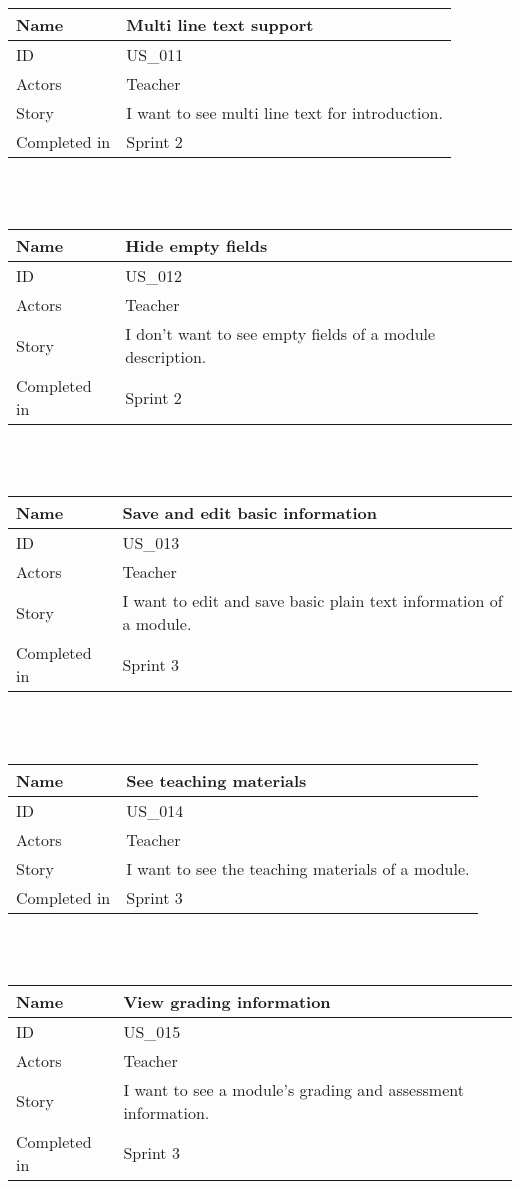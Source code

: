 \documentclass[12pt, a4paper]{article}
\newcommand\addrow[2]{#1 &#2\\ }
\newcommand\tabularhead{\begin{tabular}{lp{8cm}}
		\hline
	}
\newenvironment{usecase}{\tabularhead}
	{\hline\end{tabular}}
\begin{document}
 \begin{usecase}
 	\addrow{Name}{Multi line text support}
 	\hline
 	\addrow{ID}{US\_011}
 	\hline
 	\addrow{Actors}{ Teacher }
 	\hline		
 	\addrow{Story}{I want to see multi line text for introduction.}
 	\hline
 	\addrow{Completed in}{Sprint 2}
 \end{usecase}
 
 ~\\
 ~\\
 
 \begin{usecase}
 	\addrow{Name}{Hide empty fields}
 	\hline
 	\addrow{ID}{US\_012}
 	\hline
 	\addrow{Actors}{ Teacher }
 	\hline		
 	\addrow{Story}{I don't want to see empty fields of a module description.}
 	\hline
 	\addrow{Completed in}{Sprint 2}
 \end{usecase}

~\\
~\\
	
		    \begin{usecase}
		\addrow{Name}{Save and edit basic information}
		\hline
		\addrow{ID}{US\_013}
		\hline
		\addrow{Actors}{ Teacher }
		\hline		
		\addrow{Story}{I want to edit and save basic plain text information of a module.}
		\hline
		\addrow{Completed in}{Sprint 3}
	\end{usecase}
	
	~\\
	~\\
	
	\begin{usecase}
		\addrow{Name}{See teaching materials}
		\hline
		\addrow{ID}{US\_014}
		\hline
		\addrow{Actors}{ Teacher}
		\hline		
		\addrow{Story}{I want to see the teaching materials of a module.}
		\hline
		\addrow{Completed in}{Sprint 3}
	\end{usecase}
	
	~\\
	~\\
	
	\begin{usecase}
		\addrow{Name}{View grading information}
		\hline
		\addrow{ID}{US\_015}
		\hline
		\addrow{Actors}{ Teacher }
		\hline		
		\addrow{Story}{I want to see a module's grading and assessment information.}
		\hline
		\addrow{Completed in}{Sprint 3}
	\end{usecase}

~\\
~\\
	
\end{document}
